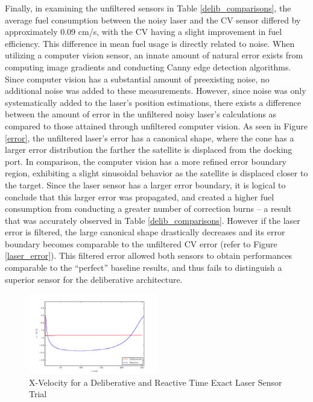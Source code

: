 \documentclass[journal, 10pt]{IEEEtran}
\begin{document}
Finally, in examining the unfiltered sensors in Table \ref{delib_comparisons}, the average fuel consumption between the noisy laser and the CV sensor differed by approximately 0.09 cm/s, with the CV having a slight improvement in fuel efficiency. This difference in mean fuel usage is directly related to noise. When utilizing a computer vision sensor, an innate amount of natural error exists from computing image gradients and conducting Canny edge detection algorithms. Since computer vision has a substantial amount of preexisting noise, no additional noise was added to these measurements. However, since noise was only systematically added to the laser's position estimations, there exists a difference between the amount of error in the unfiltered noisy laser's calculations as compared to those attained through unfiltered computer vision. As seen in Figure \ref{error}, the unfiltered laser's error has a canonical shape, where the cone has a larger error distribution the farther the satellite is displaced from the docking port. In comparison, the computer vision has a more refined error boundary region, exhibiting a slight sinusoidal behavior as the satellite is displaced closer to the target. Since the laser sensor has a larger error boundary, it is logical to conclude that this larger error was propagated, and created a higher fuel consumption from conducting a greater number of correction burns -- a result that was accurately observed in Table \ref{delib_comparisons}. However if the laser error is filtered, the large canonical shape drastically decreases and its error boundary becomes comparable to the unfiltered CV error (refer to Figure \ref{laser_error}). This filtered error allowed both sensors to obtain performances comparable to the ``perfect'' baseline results, and thus fails to distinguish a superior sensor for the deliberative architecture. 


\begin{figure}[tb]
\begin{center}
\includegraphics[width=0.5\textwidth]{figures/xVelocityClean.pdf}
\caption{X-Velocity for a Deliberative and Reactive Time Exact Laser Sensor Trial }
\label{xClean_velocity}
\end{center}
\end{figure}
\end{document}
